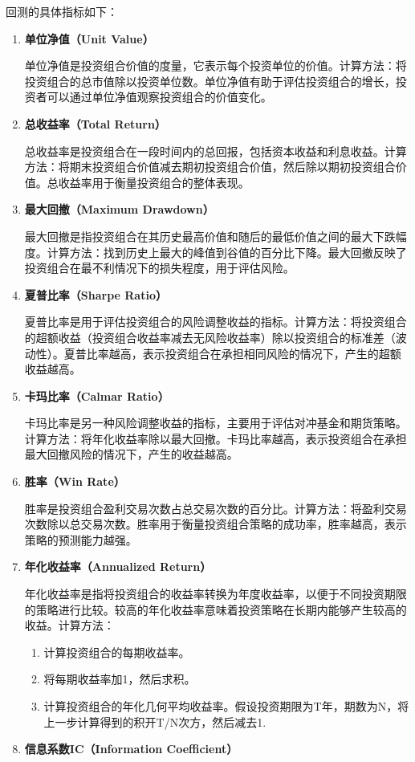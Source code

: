 \documentclass[11pt]{article}
\begin{document}
回测的具体指标如下：
\begin{enumerate}

    \item \textbf{单位净值（Unit Value）}
    
单位净值是投资组合价值的度量，它表示每个投资单位的价值。计算方法：将投资组合的总市值除以投资单位数。单位净值有助于评估投资组合的增长，投资者可以通过单位净值观察投资组合的价值变化。
    \item \textbf{总收益率（Total Return）}
    
总收益率是投资组合在一段时间内的总回报，包括资本收益和利息收益。计算方法：将期末投资组合价值减去期初投资组合价值，然后除以期初投资组合价值。总收益率用于衡量投资组合的整体表现。

\item \textbf{最大回撤（Maximum Drawdown）}

最大回撤是指投资组合在其历史最高价值和随后的最低价值之间的最大下跌幅度。计算方法：找到历史上最大的峰值到谷值的百分比下降。最大回撤反映了投资组合在最不利情况下的损失程度，用于评估风险。

\item \textbf{夏普比率（Sharpe Ratio）}

夏普比率是用于评估投资组合的风险调整收益的指标。计算方法：将投资组合的超额收益（投资组合收益率减去无风险收益率）除以投资组合的标准差（波动性）。夏普比率越高，表示投资组合在承担相同风险的情况下，产生的超额收益越高。

\item \textbf{卡玛比率（Calmar Ratio）}

卡玛比率是另一种风险调整收益的指标，主要用于评估对冲基金和期货策略。计算方法：将年化收益率除以最大回撤。卡玛比率越高，表示投资组合在承担最大回撤风险的情况下，产生的收益越高。

\item \textbf{胜率（Win Rate）}

胜率是投资组合盈利交易次数占总交易次数的百分比。计算方法：将盈利交易次数除以总交易次数。胜率用于衡量投资组合策略的成功率，胜率越高，表示策略的预测能力越强。

\item \textbf{年化收益率（Annualized Return）}

年化收益率是指将投资组合的收益率转换为年度收益率，以便于不同投资期限的策略进行比较。较高的年化收益率意味着投资策略在长期内能够产生较高的收益。计算方法：
    \begin{enumerate}
        \item 计算投资组合的每期收益率。
        \item 将每期收益率加1，然后求积。
        \item 计算投资组合的年化几何平均收益率。假设投资期限为T年，期数为N，将上一步计算得到的积开T/N次方，然后减去1.
    \end{enumerate}
\item \textbf{信息系数IC（Information Coefficient）}


\end{enumerate}
\end{document}
